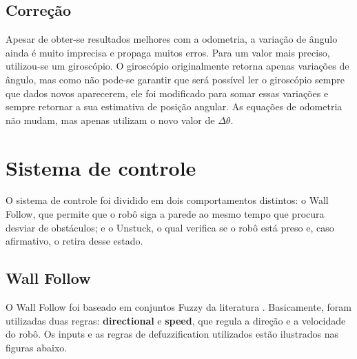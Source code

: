 \documentclass[twoside,conference,a4paper]{IEEEtran}
\begin{document}
\subsection{Correção}

Apesar de obter-se resultados melhores com a odometria, a variação de ângulo ainda é muito imprecisa e propaga muitos erros. Para um valor mais preciso, utilizou-se um giroscópio. O giroscópio originalmente retorna apenas variações de ângulo, mas como não pode-se garantir que será possível ler  o giroscópio sempre que dados novos aparecerem, ele foi modificado para somar essas variações e sempre retornar a sua estimativa de posição angular. As equações de odometria não mudam, mas apenas utilizam o novo valor de $\Delta \theta$.

\section{Sistema de controle}

O sistema de controle foi dividido em dois comportamentos distintos: o Wall Follow, que permite que o robô siga a parede ao mesmo tempo que procura desviar de obstáculos; e o Unstuck, o qual verifica se o robô está preso e, caso afirmativo, o retira desse estado.

\subsection{Wall Follow}

O Wall Follow foi baseado em conjuntos Fuzzy da literatura \cite{Reinhard:1995}. Basicamente, foram utilizadas duas regras: \textbf{directional} e \textbf{speed}, que regula a direção e a velocidade do robô. Os inputs e as regras de  defuzzification utilizados estão ilustrados nas figuras abaixo.
\end{document}
